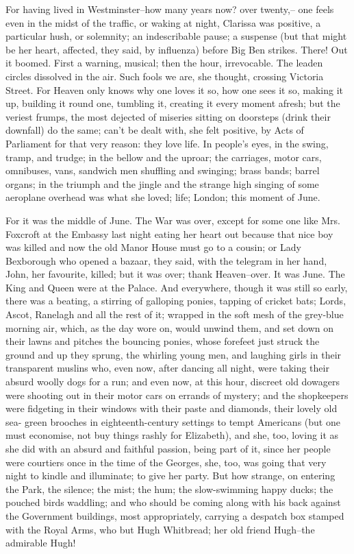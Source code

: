 \documentclass[lang=cn,10pt]{elegantbook}
\begin{document}
For having lived in Westminster--how many years now? over twenty,--
one feels even in the midst of the traffic, or waking at night,
Clarissa was positive, a particular hush, or solemnity; an
indescribable pause; a suspense (but that might be her heart,
affected, they said, by influenza) before Big Ben strikes.  There!
Out it boomed.  First a warning, musical; then the hour,
irrevocable.  The leaden circles dissolved in the air.  Such fools
we are, she thought, crossing Victoria Street.  For Heaven only
knows why one loves it so, how one sees it so, making it up,
building it round one, tumbling it, creating it every moment
afresh; but the veriest frumps, the most dejected of miseries
sitting on doorsteps (drink their downfall) do the same; can't be
dealt with, she felt positive, by Acts of Parliament for that very
reason: they love life.  In people's eyes, in the swing, tramp, and
trudge; in the bellow and the uproar; the carriages, motor cars,
omnibuses, vans, sandwich men shuffling and swinging; brass bands;
barrel organs; in the triumph and the jingle and the strange high
singing of some aeroplane overhead was what she loved; life;
London; this moment of June.

For it was the middle of June.  The War was over, except for some
one like Mrs. Foxcroft at the Embassy last night eating her heart
out because that nice boy was killed and now the old Manor House
must go to a cousin; or Lady Bexborough who opened a bazaar, they
said, with the telegram in her hand, John, her favourite, killed;
but it was over; thank Heaven--over.  It was June.  The King and
Queen were at the Palace.  And everywhere, though it was still so
early, there was a beating, a stirring of galloping ponies, tapping
of cricket bats; Lords, Ascot, Ranelagh and all the rest of it;
wrapped in the soft mesh of the grey-blue morning air, which, as
the day wore on, would unwind them, and set down on their lawns and
pitches the bouncing ponies, whose forefeet just struck the ground
and up they sprung, the whirling young men, and laughing girls in
their transparent muslins who, even now, after dancing all night,
were taking their absurd woolly dogs for a run; and even now, at
this hour, discreet old dowagers were shooting out in their motor
cars on errands of mystery; and the shopkeepers were fidgeting in
their windows with their paste and diamonds, their lovely old sea-
green brooches in eighteenth-century settings to tempt Americans
(but one must economise, not buy things rashly for Elizabeth), and
she, too, loving it as she did with an absurd and faithful passion,
being part of it, since her people were courtiers once in the time
of the Georges, she, too, was going that very night to kindle and
illuminate; to give her party.  But how strange, on entering the
Park, the silence; the mist; the hum; the slow-swimming happy
ducks; the pouched birds waddling; and who should be coming along
with his back against the Government buildings, most appropriately,
carrying a despatch box stamped with the Royal Arms, who but Hugh
Whitbread; her old friend Hugh--the admirable Hugh!
\end{document}
